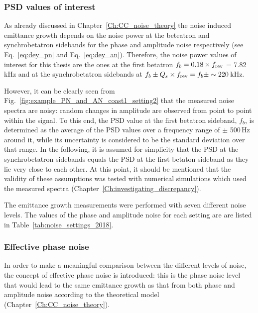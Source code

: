 \subsubsection*{PSD values of interest}
As already discussed in Chapter~\ref{Ch:CC_noise_theory} the noise induced emittance growth depends on the noise power at the beteatron and synchrobetatron sidebands for the phase and amplitude noise respectively (see Eq.~\eqref{eq:dey_pn} and Eq.~\eqref{eq:dey_an}). Therefore, the noise power values of interest for this thesis are the ones at the first betatron $f_b = 0.18 \times {f_\mathrm{rev}}$ = 7.82\,kHz and at the synchrobetatron sidebands at $f_b \pm {Q_s} \times {f_\mathrm{rev}}  = f_b \pm  \sim 220$\,kHz. 


However, it can be clearly seen from Fig.~\ref{fig:example_PN_and_AN_coast1_setting2} that the measured noise spectra are noisy: random changes in amplitude are observed from point to point within the signal. To this end, the PSD value at the first betatron sideband, $f_b$, is determined as the average of the PSD values over a frequency range of $\pm$ 500\,Hz around it, while its uncertainty is considered to be the standard deviation over that range. In the following, it is assumed for simplicity that the PSD at the synchrobetatron sidebands equals the PSD at the first betaton sideband as they lie very close to each other. At this point, it should be mentioned that the validity of these assumptions was tested with numerical simulations which used the measured spectra (Chapter~\ref{Ch:investigating_discrepancy}).

The emittance growth measurements were performed with seven different noise levels. The values of the phase and amplitude noise for each setting are are listed in Table~\ref{tab:noise_settings_2018}. 

\subsubsection*{Effective phase noise}
In order to make a meaningful comparison between the different levels of noise, the concept of effective phase noise is introduced: this is the phase noise level that would lead to the same emittance growth as that from both phase and amplitude noise according to the theoretical model (Chapter~\ref{Ch:CC_noise_theory}). 

